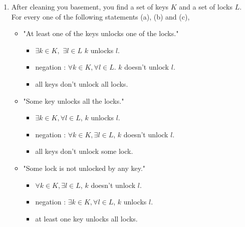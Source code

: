 \documentclass[letterpaper,12pt]{article}
\begin{document}
\begin{enumerate}
\item After cleaning you basement, you find a set of keys $K$ and a set of locks $L$. For every one of the following statements (a), (b) and (c),
\begin{itemize}
	\item "At least one of the keys unlocks one of the locks."
	\begin{itemize}
	\item $\exists k \in K,$ $ \exists l \in L$ $k$ unlocks $l$.
	\item negation : $\forall k \in K , \forall l \in L$. $k$ doesn't unlock $l$.
	\item all keys don't unlock all locks.
\end{itemize}
\item "Some key  unlocks all the locks."
\begin{itemize}
\item $\exists k \in K , \forall l \in L$, $k$ unlocks $l$.
\item negation : $\forall k \in K , \exists l  \in L$, $k$ doesn't unlock $l$.
\item all keys don't unlock some lock.
\end{itemize}
\item "Some lock is not unlocked by any key."
\begin{itemize}
\item $\forall k \in K , \exists l \in L$, $k$ doesn't unlock $l$.
\item negation : $\exists k \in K, \forall l \in  L$, $k$ unlocks $l$.
\item at least one key unlocks  all locks.
\end{itemize}
\end{itemize}


\end{enumerate}
\end{document}
